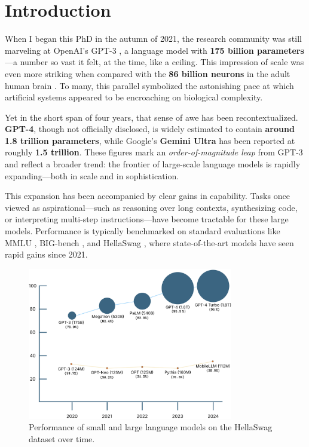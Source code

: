 \chapter{Introduction}


When I began this PhD in the autumn of 2021, the research community was still marveling at OpenAI's GPT-3 \citep{brown2020gpt3}, a language model with \textbf{175 billion parameters}—a number so vast it felt, at the time, like a ceiling. This impression of scale was even more striking when compared with the \textbf{86 billion neurons} in the adult human brain \citep{azevedo2009neurons}. To many, this parallel symbolized the astonishing pace at which artificial systems appeared to be encroaching on biological complexity.

Yet in the short span of four years, that sense of awe has been recontextualized. \textbf{GPT-4}, though not officially disclosed, is widely estimated to contain \textbf{around 1.8 trillion parameters}, while Google's \textbf{Gemini Ultra} has been reported at roughly \textbf{1.5 trillion}. These figures mark an \emph{order-of-magnitude leap} from GPT-3 and reflect a broader trend: the frontier of large-scale language models is rapidly expanding—both in scale and in sophistication.

This expansion has been accompanied by clear gains in capability. Tasks once viewed as aspirational—such as reasoning over long contexts, synthesizing code, or interpreting multi-step instructions—have become tractable for these large models. Performance is typically benchmarked on standard evaluations like MMLU \citep{hendrycks2021mmlu}, BIG-bench \citep{srivastava2023bigbench}, and HellaSwag \citep{zellers2019hellaswag}, where state-of-the-art models have seen rapid gains since 2021.


\begin{figure}[htbp]
    \centering
    \includegraphics[width=0.8\textwidth]{chapters/introduction/figures/lm_performance_comparison.pdf}
    \caption{Performance of small and large language models on the HellaSwag dataset over time.}
    \label{fig:model_size_vs_performance}
\end{figure}

